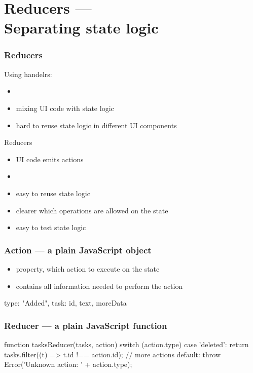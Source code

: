 \section{Reducers ---\\Separating state logic}

\begin{frame}[fragile] \frametitle{Reducers}
Using handelrs:
\begin{itemize}
  \item {}
  \item mixing UI code with state logic
  \item hard to reuse state logic in different UI components
\end{itemize}
\vspace{5mm}
Reducers
\begin{itemize}
  \item UI code emits actions
  \item {}
  \item easy to reuse state logic
  \item clearer which operations are allowed on the state
  \item easy to test state logic
\end{itemize}
\end{frame}

\begin{frame}[fragile] \frametitle{Action --- a plain JavaScript object}
\begin{itemize}
  \item {} property, which action to execute on the state
  \item contains all information needed to perform the action
\end{itemize}
\vspace{5mm}
\begin{CodeBox}{}
{
  type: "Added",
  task: { id, text, moreData}
}
\end{CodeBox}
\end{frame}

\begin{frame}[fragile] \frametitle{Reducer --- a plain JavaScript function}
\begin{CodeBox}{}
function tasksReducer(tasks, action) {
  switch (action.type) {
    case 'deleted': {
      return tasks.filter((t) => t.id !== action.id);
    }
    // more actions
    default: {
      throw Error('Unknown action: ' + action.type);
    }
  }
}
\end{CodeBox}
\end{frame}

